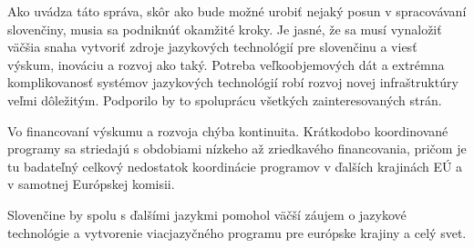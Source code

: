 \begin{multicols}{2}
Ako uvádza táto správa, skôr ako bude možné urobiť nejaký posun v spracovávaní
slovenčiny, musia sa podniknúť okamžité kroky. Je jasné, že sa musí vynaložiť
väčšia snaha vytvoriť zdroje jazykových technológií pre slovenčinu a viesť
výskum, inováciu a rozvoj ako taký. Potreba veľkoobjemových dát a extrémna
komplikovanosť systémov jazykových technológií robí rozvoj novej infraštruktúry
veľmi dôležitým. Podporilo by to spoluprácu všetkých zainteresovaných strán.

Vo financovaní výskumu a rozvoja chýba kontinuita. Krátkodobo koordinované
programy sa striedajú s obdobiami nízkeho až zriedkavého financovania, pričom
je tu badateľný celkový nedostatok koordinácie programov v ďalších krajinách EÚ
a v samotnej Európskej komisii.

Slovenčine by spolu s ďalšími jazykmi pomohol väčší záujem o jazykové technológie a vytvorenie viacjazyčného programu pre európske krajiny a celý svet.\cite{f32}

\end{multicols}

\clearpage

